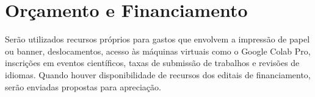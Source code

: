 \chapter{Orçamento e Financiamento}\label{chap:orcamento}

Serão utilizados recursos próprios para gastos que envolvem a impressão de papel ou banner, deslocamentos, acesso às máquinas virtuais como o Google Colab Pro, inscrições em eventos científicos, taxas de submissão de trabalhos e revisões de idiomas. Quando houver disponibilidade de recursos dos editais de financiamento, serão enviadas propostas para apreciação.

